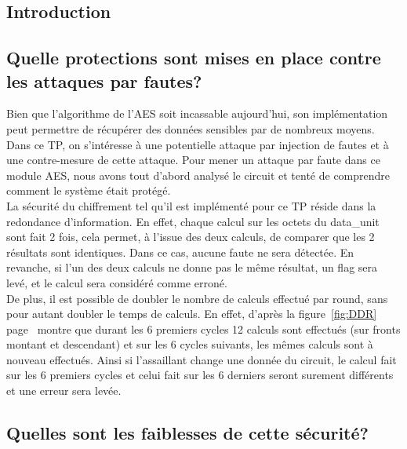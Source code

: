 \subsection{Introduction}

\subsection{Quelle protections sont mises en place contre les attaques par fautes?}

Bien que l'algorithme de l'AES soit incassable aujourd'hui, son implémentation
peut permettre de récupérer des données sensibles par de nombreux moyens.
Dans ce TP, on s'intéresse à une potentielle attaque par injection de fautes et
à une contre-mesure de cette attaque.
Pour mener un attaque par faute  dans ce module AES, nous avons tout d'abord
analysé le circuit et tenté de comprendre comment le système était protégé.\\

La sécurité du chiffrement tel qu'il est implémenté pour ce TP réside dans la
redondance d'information.
En effet, chaque calcul sur les octets du data\_unit sont fait 2 fois, cela
permet, à l'issue des deux calculs, de comparer que les 2 résultats sont
identiques.
Dans ce cas, aucune faute ne sera détectée. En revanche, si l'un des deux
calculs ne donne pas le même résultat, un flag sera levé, et le calcul sera
considéré comme erroné.\\

De plus, il est possible de doubler le nombre de calculs effectué par round,
sans pour autant doubler le temps de calculs.
En effet, d'après la figure~\ref{fig:DDR} page~\pageref{fig:DDR} montre que
durant les 6 premiers cycles 12 calculs sont effectués (sur fronts montant et
descendant)
et sur les 6 cycles suivants, les mêmes calculs sont à nouveau effectués.
Ainsi si l'assaillant change une donnée du circuit, le calcul fait sur les 6
premiers cycles et celui fait sur les 6 derniers seront surement différents et
une erreur sera levée.


\subsection{Quelles sont les faiblesses de cette sécurité?}

